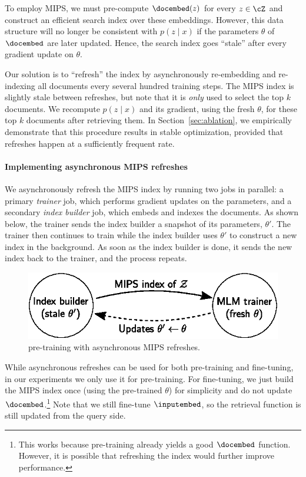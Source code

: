 To employ MIPS, we must pre-compute $\docembed(z)$ for every $z \in \cZ$  and construct an efficient search index over these embeddings. However, this data structure will no longer be consistent with $p(z \mid x)$ if the parameters $\theta$ of $\docembed$ are later updated. Hence, the search index goes ``stale'' after every gradient update on $\theta$.

Our solution is to ``refresh'' the index by asynchronously re-embedding and re-indexing all documents every several hundred training steps. The MIPS index is slightly stale between refreshes, but note that it is {\em only} used to select the top $k$ documents. We recompute $p(z \mid x)$ and its gradient, using the fresh $\theta$, for these top $k$ documents after retrieving them.
In Section~\ref{sec:ablation}, we empirically demonstrate that this procedure results in stable optimization, provided that refreshes happen at a sufficiently frequent rate.

\paragraph{Implementing asynchronous MIPS refreshes}
We asynchronously refresh the MIPS index by running two jobs in parallel: a primary {\em trainer} job, which performs gradient updates on the parameters, and a secondary {\em index builder} job, which embeds and indexes the documents. As shown below, the trainer sends the index builder a snapshot of its parameters, $\theta'$. The trainer then continues to train while the index builder uses $\theta'$ to construct a new index in the background. As soon as the index builder is done, it sends the new index back to the trainer, and the process repeats.

{
\begin{figure}
\begin{center}
\includegraphics[width=.8\columnwidth]{figures/trainer_generator.eps}
\caption{\thename pre-training with asynchronous MIPS refreshes.}
\end{center}
\end{figure}
}

While asynchronous refreshes can be used for both pre-training and fine-tuning, in our experiments we only use it for pre-training. For fine-tuning, we just build the MIPS index once (using the pre-trained $\theta$) for simplicity and do not update $\docembed$.\footnote{This works because pre-training already yields a good $\docembed$ function. However, it is possible that refreshing the index would further improve performance.} Note that we still fine-tune $\inputembed$, so the retrieval function is still updated from the query side.

